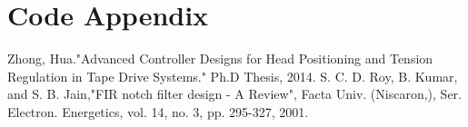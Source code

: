 \documentclass[11pt]{article}
\begin{document}
\clearpage
\appendix
\section*{Code Appendix}


\begin{thebibliography}{10} 
	 Zhong, Hua."Advanced Controller Designs for Head Positioning and Tension Regulation in Tape Drive Systems." Ph.D Thesis, 2014.
	 S. C. D. Roy, B. Kumar, and S. B. Jain,"FIR notch filter design - A Review", Facta Univ. (Niscaron,), Ser. Electron. Energetics, vol. 14, no. 3, pp. 295-327, 2001.
\end{thebibliography}
\end{document}
